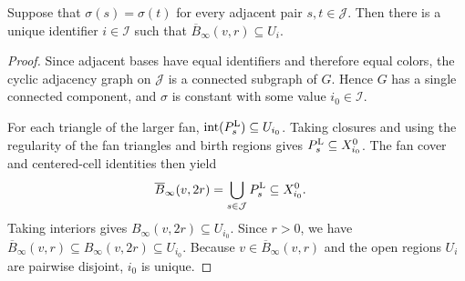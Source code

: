 \begin{lemma}
    \label{thm:area_law_initial_sector_no_active}
    \leanok
    Suppose that $\sigma(s)=\sigma(t)$ for every adjacent pair
    $s,t\in\mathcal J$. Then there is a unique identifier
    $i\in\mathcal I$ such that
    $\overline B_\infty(v,r)\subseteq U_i$.
\end{lemma}
\begin{proof}\leanok
    Since adjacent bases have equal identifiers and therefore equal colors,
    the cyclic adjacency graph on $\mathcal J$ is a connected subgraph of $G$.
    Hence $G$ has a single connected component, and $\sigma$ is constant
    with some value $i_0\in\mathcal I$.

    For each triangle of the larger fan,
    $\operatorname{int}(P_s^{\rm L})\subseteq U_{i_0}$.
    Taking closures and using the regularity of the fan triangles and birth
    regions gives $P_s^{\rm L}\subseteq X_{i_0}^0$. The fan cover and
    centered-cell identities then yield
    \begin{align}
        \overline B_\infty(v,2r)
         & =\bigcup_{s\in\mathcal J}P_s^{\rm L}
        \subseteq X_{i_0}^0.
    \end{align}
    Taking interiors gives $B_\infty(v,2r)\subseteq U_{i_0}$.
    Since $r>0$, we have $\overline B_\infty(v,r)\subseteq B_\infty(v,2r)\subseteq U_{i_0}$.
    Because $v\in\overline B_\infty(v,r)$ and the open regions $U_i$ are
    pairwise disjoint, $i_0$ is unique.
\end{proof}
